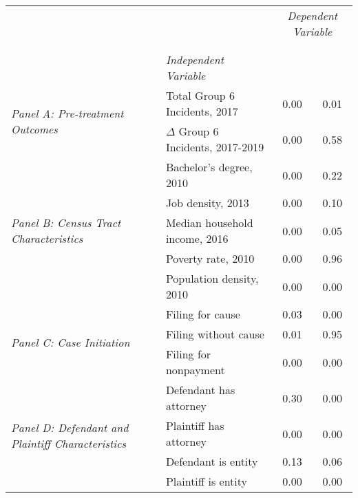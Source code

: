\begin{tabular}{llcc}
\toprule
 &  & \multicolumn{2}{c}{\textit{Dependent Variable}} \\
\cline{3-4}
\\
 &  &  &  \\
 & \emph{Independent Variable} &  &  \\
\midrule
\multirow[c]{2}{3cm}{\textit{Panel A: Pre-treatment Outcomes}} & Total Group 6 Incidents, 2017 & 0.00 & 0.01 \\
 & $\Delta$ Group 6 Incidents, 2017-2019 & 0.00 & 0.58 \\
\cline{1-4}
\multirow[c]{5}{3cm}{\textit{Panel B: Census Tract Characteristics}} & Bachelor's degree, 2010 & 0.00 & 0.22 \\
 & Job density, 2013 & 0.00 & 0.10 \\
 & Median household income, 2016 & 0.00 & 0.05 \\
 & Poverty rate, 2010 & 0.00 & 0.96 \\
 & Population density, 2010 & 0.00 & 0.00 \\
\cline{1-4}
\multirow[c]{3}{3cm}{\textit{Panel C: Case Initiation}} & Filing for cause & 0.03 & 0.00 \\
 & Filing without cause & 0.01 & 0.95 \\
 & Filing for nonpayment & 0.00 & 0.00 \\
\cline{1-4}
\multirow[c]{4}{3cm}{\textit{Panel D: Defendant and Plaintiff Characteristics}} & Defendant has attorney & 0.30 & 0.00 \\
 & Plaintiff has attorney & 0.00 & 0.00 \\
 & Defendant is entity & 0.13 & 0.06 \\
 & Plaintiff is entity & 0.00 & 0.00 \\
\cline{1-4}
\bottomrule
\end{tabular}
